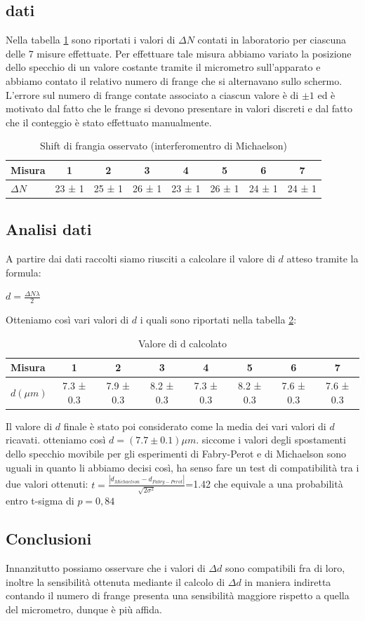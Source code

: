 \documentclass[a4paper]{article}
\begin{document}
\subsection{dati}
Nella tabella \ref{tab: micrometro Michaelson} sono riportati i valori di $\Delta N$ contati in laboratorio per ciascuna delle 7 misure effettuate. Per effettuare tale misura abbiamo variato la posizione dello specchio di un valore costante tramite il micrometro sull'apparato e abbiamo contato il relativo numero di frange che si alternavano sullo schermo. L'errore sul numero di frange contate associato a ciascun valore è di $\pm1$ ed è motivato dal fatto che le frange si devono presentare in valori discreti e dal fatto che il conteggio è stato effettuato manualmente. 
\begin{table}[htbp]
\centering
\begin{tabular}{|l|ccccccc|}
\hline
Misura & 1 & 2 & 3 & 4 & 5 & 6 & 7 \\\hline\hline
$\Delta N$ & 23 ± 1 & 25 ± 1 & 26 ± 1 & 23 ± 1 & 26 ± 1 & 24 ± 1 & 24 ± 1 \\\hline
\end{tabular}
\caption{Shift di frangia osservato (interferomentro di Michaelson)}
\label{tab: micrometro Michaelson}
\end{table}
\subsection{Analisi dati}
A partire dai dati raccolti siamo riusciti a calcolare il valore di $d$ atteso tramite la formula: 
\begin{center}
    $d=\frac{\Delta N \lambda}{2}$
\end{center}
Otteniamo così vari valori di $d$ i quali sono riportati nella tabella \ref{tab: valori d michaelson}:
\begin{table}[htbp]
\centering
\begin{tabular}{|l|ccccccc|}
\hline
Misura & 1 & 2 & 3 & 4 & 5 & 6 & 7 \\\hline\hline
$d(\mu m)$ & 7.3 ± 0.3 & 7.9 ± 0.3 & 8.2 ± 0.3 & 7.3 ± 0.3 & 8.2 ± 0.3 & 7.6 ± 0.3 & 7.6 ± 0.3 \\\hline
\end{tabular}
\caption{Valore di d calcolato}
\label{tab: valori d michaelson}
\end{table} 
Il valore di $d$ finale è stato poi considerato come la media dei vari valori di $d$ ricavati. otteniamo così $d=(7.7\pm0.1 )\mu m$.
siccome i valori degli spostamenti dello specchio movibile per gli esperimenti di Fabry-Perot e di Michaelson sono uguali in quanto li abbiamo decisi così, ha senso fare un test di compatibilità tra i due valori ottenuti:
$t=\frac{|d_{Michaelson}-d_{Fabry-Perot}|}{\sqrt{2\sigma^2}}$=1.42 che equivale a una probabilità entro t-sigma di $p=0,84$
\subsection{Conclusioni}
Innanzitutto possiamo osservare che i valori di $\Delta d$ sono compatibili fra di loro, inoltre la sensibilità ottenuta mediante il calcolo di $\Delta d$ in maniera indiretta contando il numero di frange presenta una sensibilità maggiore rispetto a quella del micrometro, dunque è più affida.
\end{document}
